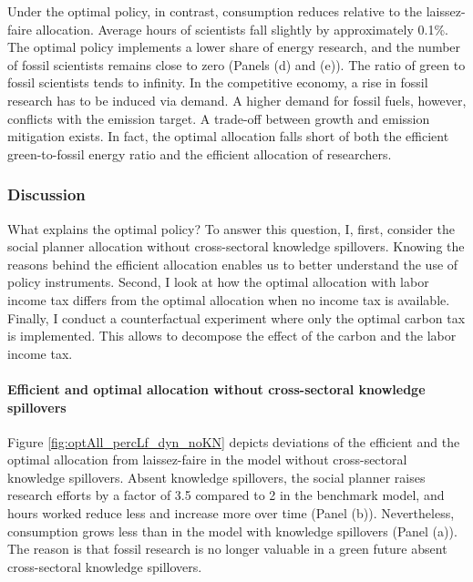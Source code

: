 Under the optimal policy, in contrast, consumption reduces relative to the laissez-faire allocation. Average hours of scientists fall slightly by approximately 0.1\%. The optimal policy implements a lower share of energy research, and the number of fossil scientists remains close to zero (Panels (d) and (e)). The ratio of green to fossil scientists tends to infinity. 
In the competitive economy, a rise in fossil research has to be induced via demand. A higher demand for fossil fuels, however,  conflicts with the emission target. A trade-off between growth and emission mitigation exists.  In fact, the optimal allocation falls short of both the efficient green-to-fossil energy ratio and the efficient allocation of researchers. %


\subsubsection{Discussion}\label{subsec:dis}

 What explains the optimal policy?  To answer this question, I, first, consider the social planner allocation without cross-sectoral knowledge spillovers. Knowing the reasons behind the efficient allocation enables us to better understand the use of policy instruments. Second, I look at how the optimal allocation with labor income tax differs from the optimal allocation when no income tax is available. 
Finally, I conduct a counterfactual experiment where only the optimal carbon tax is implemented. This allows to decompose the effect of the carbon and the labor income tax. 

\paragraph{Efficient and optimal allocation without cross-sectoral knowledge spillovers}
Figure \ref{fig:optAll_percLf_dyn_noKN} depicts deviations of the efficient and the optimal allocation from laissez-faire in the model without cross-sectoral knowledge spillovers.
Absent knowledge spillovers, the social planner raises research efforts  by a factor of 3.5 compared to 2 in the benchmark model, and hours worked reduce less and increase more over time (Panel (b)). Nevertheless, consumption grows less than in the model with knowledge spillovers (Panel (a)). The reason is that fossil research is no longer valuable in a green future absent cross-sectoral knowledge spillovers. 

